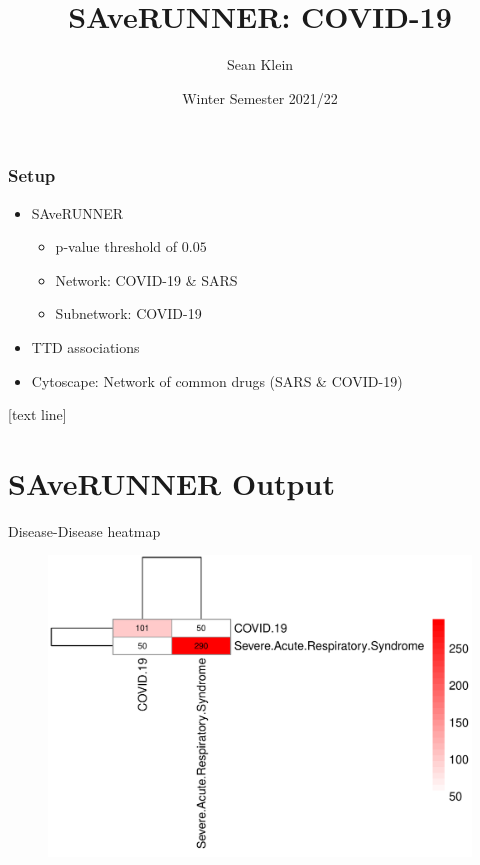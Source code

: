 \documentclass[presentation]{beamer}
\title{SAveRUNNER: COVID-19}
\author{ \fontsize{18}{50}\selectfont Sean Klein}
\institute{\fontsize{10}{50}\selectfont Digital Epidemiology and Precision Medicine}
\date{\fontsize{10}{50}\selectfont Winter Semester 2021/22}
\begin{document}
\frame{\titlepage}

\begin{frame}
\frametitle{Setup}

\begin{itemize}
    \item SAveRUNNER 
    \begin{itemize}
        \item p-value threshold of $0.05$
        \item Network: COVID-19 \& SARS
        \item Subnetwork: COVID-19
    \end{itemize}
    \item TTD associations
    \item Cytoscape: Network of common drugs (SARS \& COVID-19)
\end{itemize}

\end{frame}

[text line]{%
\parbox{\linewidth}{\vspace*{-8pt}\insertsection\hfill\insertpagenumber}} %

\section{SAveRUNNER Output}
\begin{frame}{Disease-Disease heatmap}
    \begin{figure}
         \centering
         \includegraphics[scale=0.33]{figures/Disease_Disease_Heatmap.png}
         \label{fig:DieseaseDiesease}
     \end{figure}
\end{frame}
\end{document}
